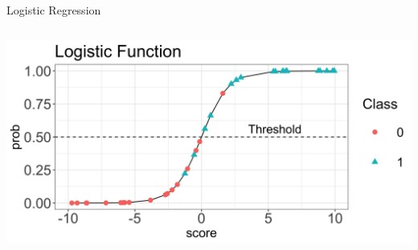 \documentclass[11pt,compress,t,notes=noshow, xcolor=table]{beamer}
\begin{document}
\begin{vbframe}{Logistic Regression}
\begin{columns}
\begin{column}{0.6\textwidth}
\begin{center}
  \includegraphics[width=1\textwidth]{figure/nutshell_classif_logistic_function.png}
\end{center}
\end{column}
\end{columns}



\end{vbframe}



\end{document}

